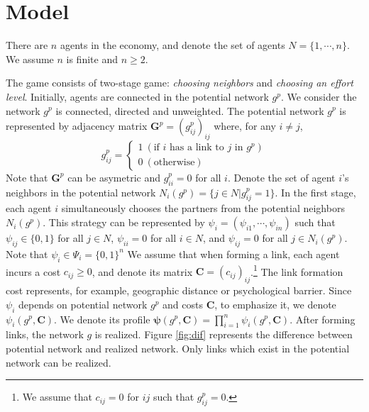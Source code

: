 \documentclass[12pt]{article}
\theoremstyle{definition}
\begin{document}
\section{Model}

There are $n$ agents in the economy, and denote the set of agents $N = \{ 1, \cdots, n\}$.
We assume $n$ is finite and $n \ge 2$.

The game consists of two-stage game: {\it{choosing neighbors}} and {\it{choosing an effort level}}.
Initially, agents are connected in the potential network $g^p$.
We consider the network $g^p$ is connected, directed and unweighted.
The potential network $g^p$ is represented by adjacency matrix $\bm{G}^p = {(g_{ij}^p)}_{ij}$ where, for any $i \neq j$,
\[ g_{ij}^p =
	\begin{cases}
		1 \  (\text{if $i$ has a link to $j$ in $g^p $}) \\
		0 \  (\text{otherwise})
	\end{cases} \]
Note that $\bm{G}^p$ can be asymetric and $g_{ii}^p = 0$ for all $i$.
Denote the set of agent $i$'s neighbors in the potential network $N_i(g^p) = \{ j \in N | g_{ij}^p = 1 \}$.
In the first stage, each agent $i$ simultaneously chooses the partners from the potential neighbors $N_i(g^p)$.
This strategy can be represented by $\psi_i = (\psi_{i1}, \cdots, \psi_{in})$ such that $\psi_{ij} \in \{0, 1\}$ for all $j \in N$, $\psi_{ii}=0$ for all $i \in N$, and $\psi_{ij} = 0$ for all $j \in N_i(g^p)$.
Note that $\psi_i \in \Psi_i = \{0, 1\}^{n}$
We assume that when forming a link, each agent incurs a cost $c_{ij} \ge 0$, and denote its matrix $\bm{C} = {(c_{ij})}_{ij}$.\footnote{We assume that $c_{ij} = 0$ for $ij$ such that $g_{ij}^p = 0$.}
The link formation cost represents, for example, geographic distance or psychological barrier.
Since $\psi_i$ depends on potential network $g^p$ and costs $\bm{C}$, to emphasize it, we denote $\psi_i(g^p, \bm{C})$.
We denote its profile $\bm{\psi}(g^p, \bm{C}) = \prod_{i=1}^n \psi_i(g^p, \bm{C})$.
After forming links, the network $g$ is realized.
Figure \ref{fig:dif} represents the difference between potential network and realized network.
Only links which exist in the potential network can be realized.
\end{document}
